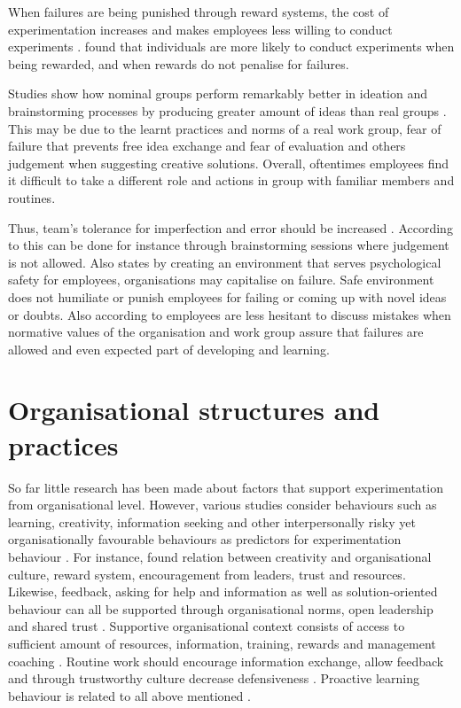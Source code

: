 When failures are being punished through reward systems, the cost of experimentation increases and makes employees less willing to conduct experiments \citep{thomke2001enlightened}.\citet{lee2004mixed} found that individuals are more likely to conduct experiments when being rewarded, and when rewards do not penalise for failures. 

Studies show how nominal groups perform remarkably better in ideation and brainstorming processes by producing greater amount of ideas than real groups \citep{jung2001transformational,sosik1998transformational}. This may be due to the learnt practices and norms of a real work group, fear of failure that prevents free idea exchange and fear of evaluation and others judgement when suggesting creative solutions. Overall, oftentimes employees find it difficult to take a different role and actions in group with familiar members and routines. \citep{jung2001transformational}

Thus, team's tolerance for imperfection and error should be increased \citep{edmondson1999psychological}. According to \citet{thomke2001enlightened} this can be done for instance through brainstorming sessions where judgement is not allowed. Also \citet{garvin2008yours} states by creating an environment that serves psychological safety for employees, organisations may capitalise on failure. Safe environment does not humiliate or punish employees for failing or coming up with novel ideas or doubts. \citet{garvin2008yours, de2001minority,amabile2008creativity, amabile1996assessing} Also according to \citet{edmondson1996learning} employees are less hesitant to discuss mistakes when normative values of the organisation and work group assure that failures are allowed and even expected part of developing and learning. 

\section{Organisational structures and practices}
So far little research has been made about factors that support experimentation from organisational level. However, various studies consider behaviours such as learning, creativity, information seeking and other interpersonally risky yet organisationally favourable behaviours as predictors for experimentation behaviour \citep{lee2004mixed,amabile1996assessing,argyris1994good,edmondson1996learning,edmondson2003speaking}. For instance, \citet{amabile1996assessing} found relation between creativity and organisational culture, reward system, encouragement from leaders, trust and resources. Likewise, feedback, asking for help and information as well as solution-oriented behaviour can all be supported through organisational norms, open leadership and shared trust \citep{ashford1992conveying,ashford1998out,lee1997going,morrison1993newcomer}. Supportive organisational context consists of access to sufficient amount of resources, information, training, rewards and management coaching \citep{edmondson1996learning}. Routine work should encourage information exchange, allow feedback and through trustworthy culture decrease defensiveness \citep{argyris1994good}. Proactive learning behaviour is related to all above mentioned \citep{edmondson2003speaking}.


